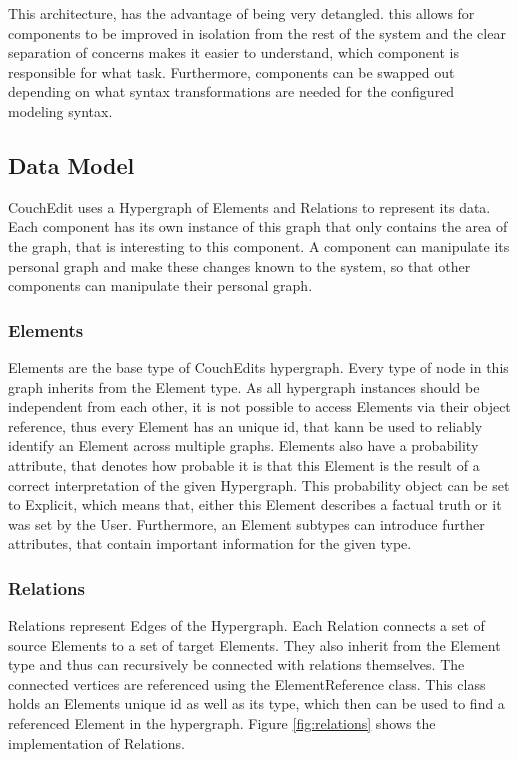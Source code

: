 This architecture, has the advantage of being very detangled. this allows for components to be improved in isolation from the rest of the system and the clear separation of concerns makes it easier to understand, which component is responsible for what task. Furthermore, components can be swapped out depending on what syntax transformations are needed for the configured modeling syntax.


\subsection{Data Model}
CouchEdit uses a Hypergraph of Elements and Relations to represent its data. Each component has its own instance of this graph that only contains the area of the graph, that is interesting to this component. A component can manipulate its personal graph and make these changes known to the system, so that other components can manipulate their personal graph.


\subsubsection{Elements}
Elements are the base type of CouchEdits hypergraph. Every type of node in this graph inherits from the Element type. As all hypergraph instances should be independent from each other, it is not possible to access Elements via their object reference, thus every Element has an unique id, that kann be used to reliably identify an Element across multiple graphs. Elements also have a probability attribute, that denotes how probable it is that this Element is the result of a correct interpretation of the given Hypergraph. This probability object can be set to Explicit, which means that, either this Element describes a factual truth or it was set by the User. Furthermore, an Element subtypes can introduce further attributes, that contain important information for the given type.

\subsubsection{Relations}
Relations represent Edges of the Hypergraph. Each Relation connects a set of source Elements to a set of target Elements. They also inherit from the Element type and thus can recursively be connected with relations themselves. The connected vertices are referenced using the ElementReference class. This class holds an Elements unique id as well as its type, which then can be used to find a referenced Element in the hypergraph. Figure \ref{fig:relations} shows the implementation of Relations. 


